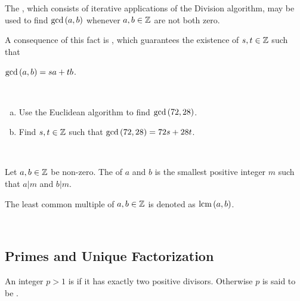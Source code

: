 \documentclass[11pt,fleqn,dvipsnames,usenames]{article}
\newcommand{\p}{\noindent}
\begin{document}
\GRAYLINE
\vsmsp

\p The , which consists of iterative applications of the Division algorithm, may be used to find $\text{gcd}\left(a,b\right)$ whenever $a,b\in \mathbb{Z}$ are not both zero.
\vsp

\p A consequence of this fact is , which guarantees the existence of $s,t\in\mathbb{Z}$ such that \begin{center}
$\text{gcd}\left(a,b\right) = sa + tb$.
\end{center}
\vsp

%
\begin{example*}~
\begin{enumerate}[(a)]
\item Use the Euclidean algorithm to find $\text{gcd}\left(72,28\right)$.
\item Find $s,t\in\mathbb{Z}$ such that $\text{gcd}\left(72,28\right) = 72s + 28t$.
\end{enumerate}
\end{example*}
%
\begin{solution}~
\newpage

\end{solution}
%
\begin{definition}
Let $a,b\in\mathbb{Z}$ be non-zero.  The  of $a$ and $b$ is the smallest positive integer $m$ such that $a|m$ and $b|m$.
\end{definition}
%
\notation The least common multiple of $a,b\in\mathbb{Z}$ is denoted as $\text{lcm}\left(a,b\right)$.
\vsp

\begin{example*}~
\vspace{1cm}

\end{example*}

\subsection{Primes and Unique Factorization}

\begin{definition}
An integer $p > 1$ is  if it has exactly two positive divisors.  Otherwise $p$ is said to be .
\end{definition}
\vsmsp

\begin{example*}~
\vspace{1cm}

\end{example*}
\end{document}
